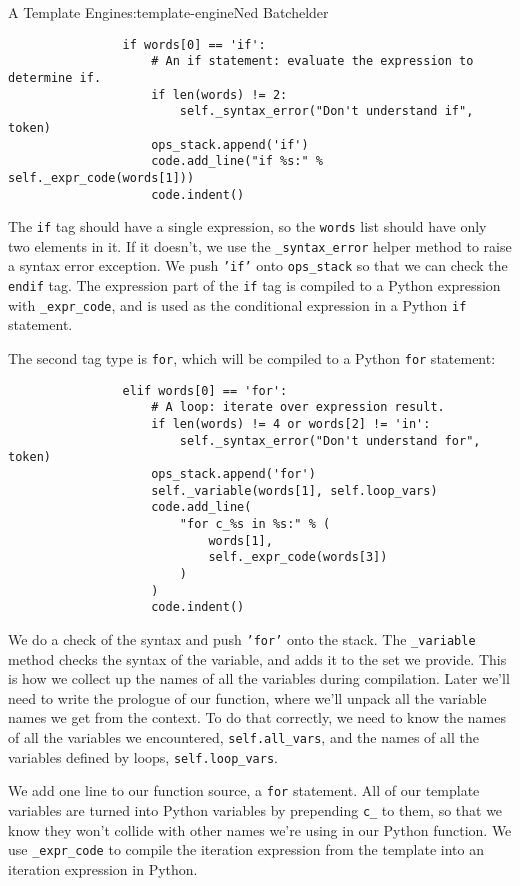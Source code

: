 \begin{aosachapter}{A Template Engine}{s:template-engine}{Ned Batchelder}
\begin{verbatim}
                if words[0] == 'if':
                    # An if statement: evaluate the expression to determine if.
                    if len(words) != 2:
                        self._syntax_error("Don't understand if", token)
                    ops_stack.append('if')
                    code.add_line("if %s:" % self._expr_code(words[1]))
                    code.indent()
\end{verbatim}

The \texttt{if} tag should have a single expression, so the
\texttt{words} list should have only two elements in it. If it doesn't,
we use the \texttt{\_syntax\_error} helper method to raise a syntax
error exception. We push \texttt{'if'} onto \texttt{ops\_stack} so that
we can check the \texttt{endif} tag. The expression part of the
\texttt{if} tag is compiled to a Python expression with
\texttt{\_expr\_code}, and is used as the conditional expression in a
Python \texttt{if} statement.

The second tag type is \texttt{for}, which will be compiled to a Python
\texttt{for} statement:

\begin{verbatim}
                elif words[0] == 'for':
                    # A loop: iterate over expression result.
                    if len(words) != 4 or words[2] != 'in':
                        self._syntax_error("Don't understand for", token)
                    ops_stack.append('for')
                    self._variable(words[1], self.loop_vars)
                    code.add_line(
                        "for c_%s in %s:" % (
                            words[1],
                            self._expr_code(words[3])
                        )
                    )
                    code.indent()
\end{verbatim}

We do a check of the syntax and push \texttt{'for'} onto the stack. The
\texttt{\_variable} method checks the syntax of the variable, and adds
it to the set we provide. This is how we collect up the names of all the
variables during compilation. Later we'll need to write the prologue of
our function, where we'll unpack all the variable names we get from the
context. To do that correctly, we need to know the names of all the
variables we encountered, \texttt{self.all\_vars}, and the names of all
the variables defined by loops, \texttt{self.loop\_vars}.

We add one line to our function source, a \texttt{for} statement. All of
our template variables are turned into Python variables by prepending
\texttt{c\_} to them, so that we know they won't collide with other
names we're using in our Python function. We use \texttt{\_expr\_code}
to compile the iteration expression from the template into an iteration
expression in Python.


\end{aosachapter}
